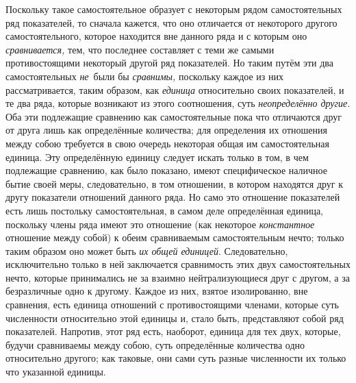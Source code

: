 Поскольку такое самостоятельное образует с некоторым рядом самостоятельных ряд
показателей, то сначала кажется, что оно отличается от некоторого другого
самостоятельного, которое находится вне данного ряда и с которым оно
{\em сравнивается,} тем, что последнее составляет с теми же самыми
противостоящими некоторый другой ряд показателей. Но таким путём эти два
самостоятельных {\em не}~были бы {\em сравнимы,} поскольку каждое из них
рассматривается, таким образом, как {\em единица} относительно своих
показателей, и те два ряда, которые возникают из этого соотношения, суть
{\em неопределённо другие}. Оба эти подлежащие сравнению как самостоятельные
пока что отличаются друг от друга лишь как определённые количества; для
определения их отношения между собою требуется в свою очередь некоторая общая
им самостоятельная единица. Эту определённую единицу следует искать только в
том, в чем подлежащие сравнению, как было показано, имеют специфическое
наличное бытие своей меры, следовательно, в том отношении, в котором находятся
друг к другу показатели отношений данного ряда. Но само это отношение
показателей есть лишь постольку самостоятельная, в самом деле определённая
единица, поскольку члены ряда имеют это отношение (как некоторое
{\em константное} отношение между собой) к обеим сравниваемым самостоятельным
нечто; только таким образом оно может быть {\em их общей единицей}.
Следовательно, исключительно только в ней заключается сравнимость этих двух
самостоятельных нечто, которые принимались не за взаимно нейтрализующиеся друг
с другом, а за безразличные одно к другому. Каждое из них, взятое изолированно,
вне сравнения, есть единица отношений с противостоящими членами, которые суть
численности относительно этой единицы и, стало быть, представляют собой ряд
показателей. Напротив, этот ряд есть, наоборот, единица для тех двух, которые,
будучи сравниваемы между собою, суть определённые количества одно относительно
другого; как таковые, они сами суть разные численности их только что указанной
единицы.

